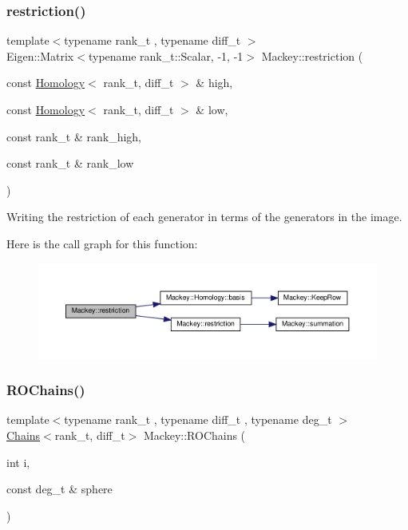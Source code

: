 \subsubsection{\texorpdfstring{restriction()}{restriction()}\hspace{0.1cm}{\footnotesize\ttfamily [2/2]}}
{\footnotesize\ttfamily template$<$typename rank\+\_\+t , typename diff\+\_\+t $>$ \\
Eigen\+::\+Matrix$<$typename rank\+\_\+t\+::\+Scalar, -\/1, -\/1$>$ Mackey\+::restriction (\begin{DoxyParamCaption}\item[{const \hyperlink{classMackey_1_1Homology}{Homology}$<$ rank\+\_\+t, diff\+\_\+t $>$ \&}]{high,  }\item[{const \hyperlink{classMackey_1_1Homology}{Homology}$<$ rank\+\_\+t, diff\+\_\+t $>$ \&}]{low,  }\item[{const rank\+\_\+t \&}]{rank\+\_\+high,  }\item[{const rank\+\_\+t \&}]{rank\+\_\+low }\end{DoxyParamCaption})}



Writing the restriction of each generator in terms of the generators in the image. 

Here is the call graph for this function\+:\nopagebreak
\begin{figure}[H]
\begin{center}
\leavevmode
\includegraphics[width=350pt]{namespaceMackey_a256b1e73e413a924ce2bf0e86551a928_cgraph}
\end{center}
\end{figure}
\mbox{\label{namespaceMackey_a08fd3743ffb625fceca454da757dfa5d}} 
\subsubsection{\texorpdfstring{R\+O\+Chains()}{ROChains()}\hspace{0.1cm}{\footnotesize\ttfamily [1/2]}}
{\footnotesize\ttfamily template$<$typename rank\+\_\+t , typename diff\+\_\+t , typename deg\+\_\+t $>$ \\
\hyperlink{classMackey_1_1Chains}{Chains}$<$rank\+\_\+t, diff\+\_\+t$>$ Mackey\+::\+R\+O\+Chains (\begin{DoxyParamCaption}\item[{int}]{i,  }\item[{const deg\+\_\+t \&}]{sphere }\end{DoxyParamCaption})}




